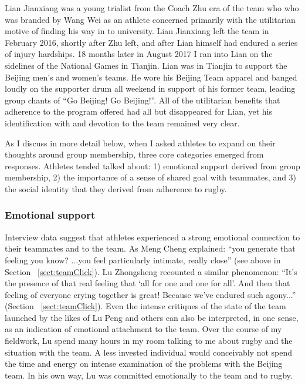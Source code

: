 \begin{CJK}{UTF8}{gbsn}
Lian Jianxiang was a young trialist from the Coach Zhu era of the team who who was branded by Wang Wei as an athlete concerned primarily with the utilitarian motive of finding his way in to university.  Lian Jianxiang left the team in February 2016, shortly after Zhu left, and after Lian himself had endured a series of injury hardships.  18 months later in August 2017 I ran into Lian on the sidelines of the National Games in Tianjin. Lian was in Tianjin to support the Beijing men's and women's teams.  He wore his Beijing Team apparel and banged loudly on the supporter drum all weekend in support of his former team, leading group chants of ``Go Beijing! Go Beijing!''.  All of the utilitarian benefits that adherence to the program offered had all but disappeared for Lian, yet his identification with and devotion to the team remained very clear.

As I discuss in more detail below, when I asked athletes to expand on their thoughts around group membership, three core categories emerged from responses.  Athletes tended talked about: 1) emotional support derived from group membership, 2) the importance of a sense of shared goal with teammates, and 3) the social identity that they derived from adherence to rugby.


  \subsubsection{Emotional support\label{sect:emoSupport}}

Interview data suggest that athletes experienced a strong emotional connection to their teammates and to the team.  As Meng Cheng explained: ``you generate that feeling you know? ...you feel particularly intimate, really close'' (see above in Section ~\ref{sect:teamClick}).  Lu Zhongsheng recounted a similar phenomenon: ``It's the presence of that real feeling that `all for one and one for all'.  And then that feeling of everyone crying together is great! Because we've endured such agony...'' (Section ~\ref{sect:teamClick}).  Even the intense critiques of the state of the team launched by the likes of Lu Peng and others can also be interpreted, in one sense, as an indication of emotional attachment to the team.  Over the course of my fieldwork, Lu spend many hours in my room talking to me about rugby and the situation with the team.  A less invested individual would conceivably not spend the time and energy on intense examination of the problems with the Beijing team.  In his own way, Lu was committed emotionally to the team and to rugby.


\end{CJK}
